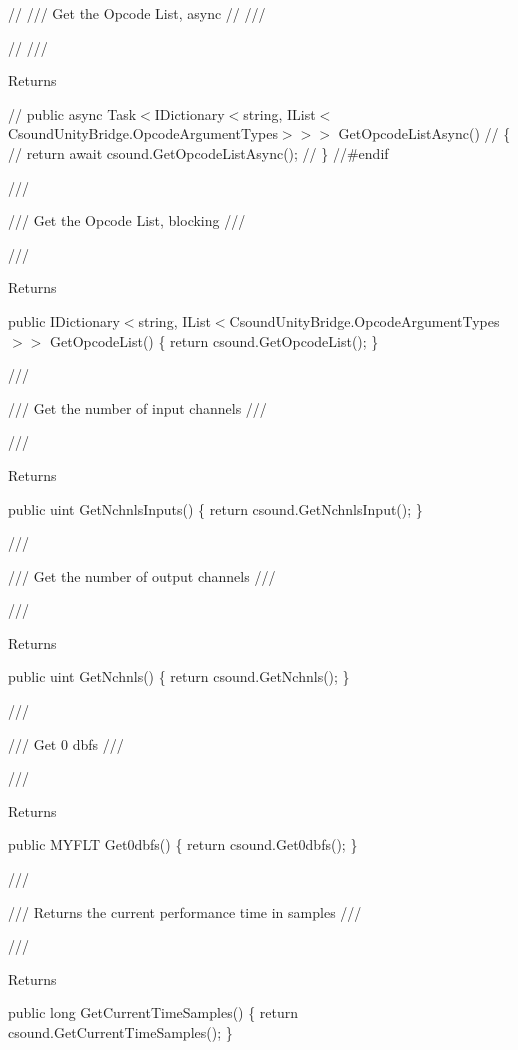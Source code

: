 // /// Get the Opcode List, async // /// 

// /// \begin{DoxyReturn}{Returns}

\end{DoxyReturn}
// public async Task$<$\+IDictionary$<$string, IList$<$\+Csound\+Unity\+Bridge.\+Opcode\+Argument\+Types$>$$>$$>$ Get\+Opcode\+List\+Async() // \{ // return await csound.\+Get\+Opcode\+List\+Async(); // \} //\#endif

/// 

/// Get the Opcode List, blocking /// 

/// \begin{DoxyReturn}{Returns}

\end{DoxyReturn}
public IDictionary$<$string, IList$<$\+Csound\+Unity\+Bridge.\+Opcode\+Argument\+Types$>$$>$ Get\+Opcode\+List() \{ return csound.\+Get\+Opcode\+List(); \}

/// 

/// Get the number of input channels /// 

/// \begin{DoxyReturn}{Returns}

\end{DoxyReturn}
public uint Get\+Nchnls\+Inputs() \{ return csound.\+Get\+Nchnls\+Input(); \}

/// 

/// Get the number of output channels /// 

/// \begin{DoxyReturn}{Returns}

\end{DoxyReturn}
public uint Get\+Nchnls() \{ return csound.\+Get\+Nchnls(); \}

/// 

/// Get 0 dbfs /// 

/// \begin{DoxyReturn}{Returns}

\end{DoxyReturn}
public MYFLT Get0dbfs() \{ return csound.\+Get0dbfs(); \}

/// 

/// Returns the current performance time in samples /// 

/// \begin{DoxyReturn}{Returns}

\end{DoxyReturn}
public long Get\+Current\+Time\+Samples() \{ return csound.\+Get\+Current\+Time\+Samples(); \}


